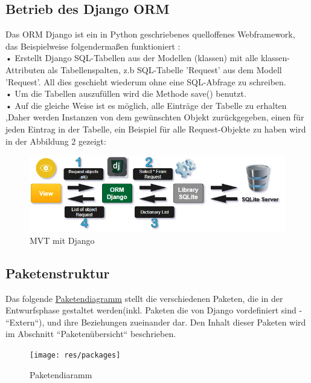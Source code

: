 \documentclass[parskip=full,11pt]{scrartcl}
\begin{document}
 \subsection{Betrieb des Django ORM} 
 
Das \gls{ORM} Django ist ein in Python geschriebenes quelloffenes Webframework, das Beispielweise folgendermaßen funktioniert :\\
 • Erstellt Django SQL-Tabellen aus der Modellen (klassen) mit alle klassen-Attributen als Tabellenspalten, z.b SQL-Tabelle 'Request' aus dem Modell 'Request'. All dies geschieht wiederum ohne eine SQL-Abfrage zu schreiben.\\
 • Um die Tabellen auszufüllen wird die Methode save() benutzt.\\
 • Auf die gleiche Weise ist es möglich, alle Einträge der Tabelle zu erhalten ,Daher werden Instanzen von dem gewünschten Objekt zurückgegeben, einen für jeden Eintrag in der Tabelle, ein Beispiel für alle Request-Objekte zu haben wird in der Abbildung 2 gezeigt:\\

  	\vspace{2cm}



\begin{figure}[ht!]
  	\includegraphics[width=1.05\textwidth]{res/MVTpart2.png}
  	 	\centering
  	    \caption{MVT mit Django}
 \end{figure}

 	

\newpage
 \subsection{Paketenstruktur}
 Das folgende \hyperref[packages]{Paketendiagramm} stellt die verschiedenen Paketen, die in der Entwurfsphase gestaltet werden(inkl. Paketen die von Django vordefiniert sind - ``Extern``), und ihre Beziehungen zueinander dar. Den Inhalt dieser Paketen wird im Abschnitt ``Paketenübersicht`` beschrieben.\\
 \begin{figure}[h]
 	\texttt{[image: res/packages]}
 	\centering
 	\caption{Paketendiaramm}
 	\label{packages}
 \end{figure}
 
\end{document}
